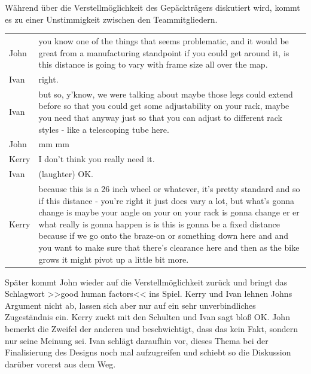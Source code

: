 \medskip Während über die Verstellmöglichkeit des Gepäckträgers diskutiert wird, kommt es zu einer Unstimmigkeit zwischen den Teammitgliedern.

\begin{extract}[Das Team ist sich nicht einig.]
	{
		\myfloatalign
		\begin{tabularx}{\textwidth}{p{1cm}X}
    		John & you know one of the things that seems problematic, and it would be great from a manufacturing standpoint if you could get around it, is this distance is going to vary with frame size all over the map.\\
			Ivan & right.\\
			Ivan & but so, y'know, we were talking about maybe those legs could extend before so that you could get some adjustability on your rack, maybe you need that anyway just so that you can adjust to different rack styles - like a telescoping tube here.\\
			John & mm mm \\
			Kerry & I don't think you really need it. \\
			Ivan & (laughter) OK.\\
			Kerry & because this is a 26 inch wheel or whatever, it's pretty standard and so if this distance - you're right it just does vary a lot, but what's gonna change is maybe your angle on your on your rack is gonna change er er what really is gonna happen is is this is gonna be a fixed distance because if we go onto the braze-on or something down here and and you want to make sure that there's clearance here and then as the bike grows it might pivot up a little bit more.
		\end{tabularx}
	}
\end{extract}

Später kommt John wieder auf die Verstellmöglichkeit zurück und bringt das Schlagwort >>good human factors<< ins Spiel. Kerry und Ivan lehnen Johns Argument nicht ab, lassen sich aber nur auf ein sehr unverbindliches Zugeständnis ein. Kerry zuckt mit den Schulten und Ivan sagt bloß OK. John bemerkt die Zweifel der anderen und beschwichtigt, dass das kein Fakt, sondern nur seine Meinung sei. Ivan schlägt daraufhin vor, dieses Thema bei der Finalisierung des Designs noch mal aufzugreifen und schiebt so die Diskussion darüber vorerst aus dem Weg.

